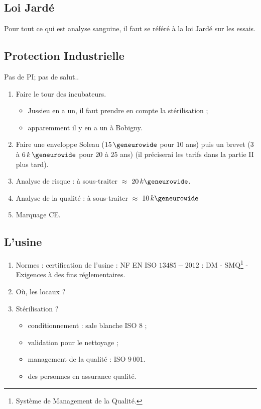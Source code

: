 \documentclass[a4paper,11pt]{article}
\newcounter{pte}
\begin{document}
\begin{sloppypar}
\subsection{Loi Jardé}
Pour tout ce qui est analyse sanguine, il faut se référé à la loi Jardé sur les essais.

\subsection{Protection Industrielle}
\og Pas de PI; pas de salut.\fg.\\
\begin{enumerate}
 \item Faire le tour des incubateurs.
 \begin{itemize}
  \item Jussieu en a un, il faut prendre en compte la stérilisation ;
  \item apparemment il y en a un à Bobigny.
 \end{itemize}
\item Faire une enveloppe Soleau ($15\,\geneurowide$ pour $10$ ans) puis un brevet ($3$ à $6\,k\,\geneurowide$ pour $20$ à $25$ ans) (il préciserai les tarifs dans la partie II plus tard).
\item Analyse de risque : à sous-traiter $\approx$ $20\,k\geneurowide$.
\item Analyse de la qualité : à sous-traiter $\approx$ $10\,k\geneurowide$
\item Marquage CE.
\end{enumerate}

\subsection{L'usine}
\begin{enumerate}
 \item Normes : certification de l'usine : NF EN ISO $13485-2012$ : DM - SMQ\footnote{Système de Management de la Qualité.} - Exigences à des fins réglementaires.
 \item Où, les locaux ?
 \item Stérilisation ?
 \begin{itemize}
  \item conditionnement : sale blanche ISO 8 ;
  \item validation pour le nettoyage ;
  \item management de la qualité : ISO $9\,001$.
  \item des personnes en assurance qualité.
 \end{itemize}
\end{enumerate}


\end{sloppypar}
\end{document}
